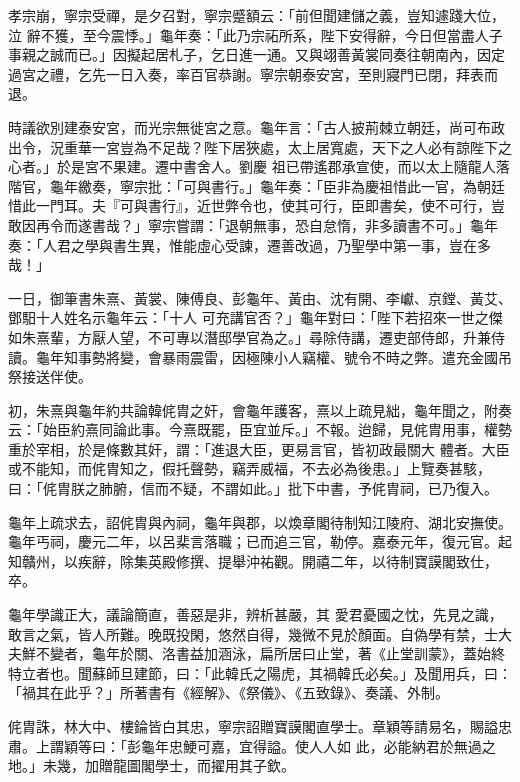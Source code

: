 \begin{pinyinscope}
 孝宗崩，寧宗受禪，是夕召對，寧宗蹙額云：「前但聞建儲之義，豈知遽踐大位，泣
 辭不獲，至今震悸。」龜年奏：「此乃宗祏所系，陛下安得辭，今日但當盡人子事親之誠而已。」因擬起居札子，乞日進一通。又與翊善黃裳同奏往朝南內，因定過宮之禮，乞先一日入奏，率百官恭謝。寧宗朝泰安宮，至則寢門已閉，拜表而退。



 時議欲別建泰安宮，而光宗無徙宮之意。龜年言：「古人披荊棘立朝廷，尚可布政出令，況重華一宮豈為不足哉？陛下居狹處，太上居寬處，天下之人必有諒陛下之心者。」於是宮不果建。遷中書舍人。劉慶
 祖已帶遙郡承宣使，而以太上隨龍人落階官，龜年繳奏，寧宗批：「可與書行。」龜年奏：「臣非為慶祖惜此一官，為朝廷惜此一門耳。夫『可與書行』，近世弊令也，使其可行，臣即書矣，使不可行，豈敢因再令而遂書哉？」寧宗嘗謂：「退朝無事，恐自怠惰，非多讀書不可。」龜年奏：「人君之學與書生異，惟能虛心受諫，遷善改過，乃聖學中第一事，豈在多哉！」



 一日，御筆書朱熹、黃裳、陳傅良、彭龜年、黃由、沈有開、李巘、京鏜、黃艾、鄧馹十人姓名示龜年云：「十人
 可充講官否？」龜年對曰：「陛下若招來一世之傑如朱熹輩，方厭人望，不可專以潛邸學官為之。」尋除侍講，遷吏部侍郎，升兼侍讀。龜年知事勢將變，會暴雨震雷，因極陳小人竊權、號令不時之弊。遣充金國吊祭接送伴使。



 初，朱熹與龜年約共論韓侂胄之奸，會龜年護客，熹以上疏見絀，龜年聞之，附奏云：「始臣約熹同論此事。今熹既罷，臣宜並斥。」不報。迨歸，見侂胄用事，權勢重於宰相，於是條數其奸，謂：「進退大臣，更易言官，皆初政最關大
 體者。大臣或不能知，而侂胄知之，假托聲勢，竊弄威福，不去必為後患。」上覽奏甚駭，曰：「侂胄朕之肺腑，信而不疑，不謂如此。」批下中書，予侂胄祠，已乃復入。



 龜年上疏求去，詔侂胄與內祠，龜年與郡，以煥章閣待制知江陵府、湖北安撫使。龜年丐祠，慶元二年，以呂棐言落職；已而追三官，勒停。嘉泰元年，復元官。起知贛州，以疾辭，除集英殿修撰、提舉沖祐觀。開禧二年，以待制寶謨閣致仕，卒。



 龜年學識正大，議論簡直，善惡是非，辨析甚嚴，其
 愛君憂國之忱，先見之識，敢言之氣，皆人所難。晚既投閑，悠然自得，幾微不見於顏面。自偽學有禁，士大夫鮮不變者，龜年於關、洛書益加涵泳，扁所居曰止堂，著《止堂訓蒙》，蓋始終特立者也。聞蘇師旦建節，曰：「此韓氏之陽虎，其禍韓氏必矣。」及聞用兵，曰：「禍其在此乎？」所著書有《經解》、《祭儀》、《五致錄》、奏議、外制。



 侂胄誅，林大中、樓錀皆白其忠，寧宗詔贈寶謨閣直學士。章穎等請易名，賜謚忠肅。上謂穎等曰：「彭龜年忠鯁可嘉，宜得謚。使人人如
 此，必能納君於無過之地。」未幾，加贈龍圖閣學士，而擢用其子欽。




\end{pinyinscope}
